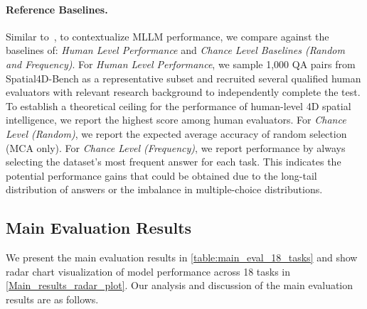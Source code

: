 \documentclass{article}
\begin{document}
\paragraph{Reference Baselines.}
Similar to~\cite{Yang_2025_CVPR}, to contextualize MLLM performance, we compare against the baselines of: \textit{Human Level Performance} and \textit{Chance Level Baselines (Random and Frequency)}. 
For \textit{Human Level Performance}, we sample 1,000 QA pairs from Spatial4D-Bench as a representative subset and recruited several qualified human evaluators with relevant research background to independently complete the test.
To establish a theoretical ceiling for the performance of human-level 4D spatial intelligence, we report the highest score among human evaluators. 
For \textit{Chance Level (Random)}, we report the expected average accuracy of random selection (MCA only).
For \textit{Chance Level (Frequency)}, we report performance by always selecting the dataset's most frequent answer for each task. This indicates the potential performance gains that could be obtained due to the long-tail distribution of answers or the imbalance in multiple-choice distributions.







\subsection{Main Evaluation Results}
\label{sec:main_results}
We present the main evaluation results in \cref{table:main_eval_18_tasks} and show radar chart visualization of model performance across 18 tasks in \cref{Main_results_radar_plot}.
Our analysis and discussion of the main evaluation results are as follows.
\end{document}
